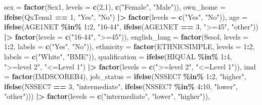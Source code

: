 \documentclass[
]{article}
\newenvironment{Shaded}{\begin{snugshade}}{\end{snugshade}}
\newcommand{\AttributeTok}[1]{\textcolor[rgb]{0.13,0.29,0.53}{#1}}
\newcommand{\DecValTok}[1]{\textcolor[rgb]{0.00,0.00,0.81}{#1}}
\newcommand{\FunctionTok}[1]{\textcolor[rgb]{0.13,0.29,0.53}{\textbf{#1}}}
\newcommand{\NormalTok}[1]{#1}
\newcommand{\SpecialCharTok}[1]{\textcolor[rgb]{0.81,0.36,0.00}{\textbf{#1}}}
\newcommand{\StringTok}[1]{\textcolor[rgb]{0.31,0.60,0.02}{#1}}
\begin{document}
\begin{Shaded}
\begin{Highlighting}[]
    \AttributeTok{sex =} \FunctionTok{factor}\NormalTok{(Sex1, }\AttributeTok{levels =} \FunctionTok{c}\NormalTok{(}\DecValTok{2}\NormalTok{,}\DecValTok{1}\NormalTok{), }\FunctionTok{c}\NormalTok{(}\StringTok{"Female"}\NormalTok{, }\StringTok{"Male"}\NormalTok{)),}
    \AttributeTok{own\_home =} \FunctionTok{ifelse}\NormalTok{(QxTenu1 }\SpecialCharTok{==} \DecValTok{1}\NormalTok{, }\StringTok{"Yes"}\NormalTok{, }\StringTok{"No"}\NormalTok{) }\SpecialCharTok{|\textgreater{}}
      \FunctionTok{factor}\NormalTok{(}\AttributeTok{levels =} \FunctionTok{c}\NormalTok{(}\StringTok{"Yes"}\NormalTok{, }\StringTok{"No"}\NormalTok{)),}
    \AttributeTok{age =} \FunctionTok{ifelse}\NormalTok{(AGE1NET }\SpecialCharTok{\%in\%} \DecValTok{1}\SpecialCharTok{:}\DecValTok{2}\NormalTok{, }\StringTok{"16{-}44"}\NormalTok{,}
                 \FunctionTok{ifelse}\NormalTok{(AGE1NET }\SpecialCharTok{==} \DecValTok{3}\NormalTok{, }\StringTok{"\textgreater{}=45"}\NormalTok{, }\StringTok{"other"}\NormalTok{)) }\SpecialCharTok{|\textgreater{}}
      \FunctionTok{factor}\NormalTok{(}\AttributeTok{levels =} \FunctionTok{c}\NormalTok{(}\StringTok{"16{-}44"}\NormalTok{, }\StringTok{"\textgreater{}=45"}\NormalTok{)),}
    \AttributeTok{english\_lang =} \FunctionTok{factor}\NormalTok{(Sesol, }\AttributeTok{levels =} \DecValTok{1}\SpecialCharTok{:}\DecValTok{2}\NormalTok{, }\AttributeTok{labels =} \FunctionTok{c}\NormalTok{(}\StringTok{"Yes"}\NormalTok{, }\StringTok{"No"}\NormalTok{)),}
    \AttributeTok{ethnicity =} \FunctionTok{factor}\NormalTok{(ETHNICSIMPLE, }\AttributeTok{levels =} \DecValTok{1}\SpecialCharTok{:}\DecValTok{2}\NormalTok{, }\AttributeTok{labels =} \FunctionTok{c}\NormalTok{(}\StringTok{"White"}\NormalTok{, }\StringTok{"BME"}\NormalTok{)),}
    \AttributeTok{qualification =} \FunctionTok{ifelse}\NormalTok{(HIQUAL }\SpecialCharTok{\%in\%} \DecValTok{1}\SpecialCharTok{:}\DecValTok{4}\NormalTok{, }\StringTok{"\textgreater{}=level 2"}\NormalTok{, }\StringTok{"\textless{}=Level 1"}\NormalTok{) }\SpecialCharTok{|\textgreater{}}
      \FunctionTok{factor}\NormalTok{(}\AttributeTok{levels =} \FunctionTok{c}\NormalTok{(}\StringTok{"\textgreater{}=level 2"}\NormalTok{, }\StringTok{"\textless{}=Level 1"}\NormalTok{)),}
    \AttributeTok{imd =} \FunctionTok{factor}\NormalTok{(IMDSCOREB4),}
    \AttributeTok{job\_status =} \FunctionTok{ifelse}\NormalTok{(NSSEC7 }\SpecialCharTok{\%in\%} \DecValTok{1}\SpecialCharTok{:}\DecValTok{2}\NormalTok{, }\StringTok{"higher"}\NormalTok{,}
                        \FunctionTok{ifelse}\NormalTok{(NSSEC7 }\SpecialCharTok{==} \DecValTok{3}\NormalTok{, }\StringTok{"intermediate"}\NormalTok{,}
                               \FunctionTok{ifelse}\NormalTok{(NSSEC7 }\SpecialCharTok{\%in\%} \DecValTok{4}\SpecialCharTok{:}\DecValTok{10}\NormalTok{, }\StringTok{"lower"}\NormalTok{, }\StringTok{"other"}\NormalTok{))) }\SpecialCharTok{|\textgreater{}}
      \FunctionTok{factor}\NormalTok{(}\AttributeTok{levels =} \FunctionTok{c}\NormalTok{(}\StringTok{"intermediate"}\NormalTok{, }\StringTok{"lower"}\NormalTok{, }\StringTok{"higher"}\NormalTok{)),}


\end{Highlighting}
\end{Shaded}
\end{document}
